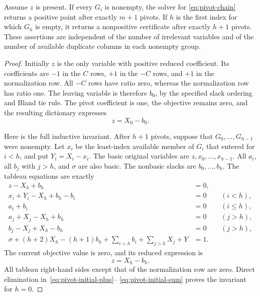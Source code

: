 \begin{lemma}\label{lem:pivot-chain}
Assume $z$ is present. If every $G_i$ is nonempty, the solver for
\eqref{eq:pivot-chain} returns a positive point after exactly $m+1$ pivots.
If $h$ is the first index for which $G_h$ is empty, it returns a nonpositive
certificate after exactly $h+1$ pivots. These assertions are independent
of the number of irrelevant variables and of the number of available
duplicate columns in each nonempty group.
\end{lemma}
\begin{proof}
Initially $z$ is the only variable with positive reduced coefficient.
Its coefficients are $-1$ in the $C$ rows, $+1$ in the $-C$ rows, and
$+1$ in the normalization row. All $-C$ rows have ratio zero, whereas
the normalization row has ratio one. The leaving variable is therefore
$b_0$, by the specified slack ordering and Bland tie rule. The pivot
coefficient is one, the objective remains zero, and the resulting
dictionary expresses
\[
 z=X_0-b_0.
\]

Here is the full inductive invariant. After $h+1$ pivots, suppose that
$G_0,\ldots,G_{h-1}$ were nonempty. Let $x_i$ be the least-index available
member of $G_i$ that entered for $i<h$, and put $Y_i=X_i-x_i$.
The basic original variables are $z,x_0,\ldots,x_{h-1}$. All $a_i$, all
$b_j$ with $j>h$, and $\sigma$ are also basic. The nonbasic slacks are
$b_0,\ldots,b_h$. The tableau equations are exactly
\begin{align}
 z-X_h+b_h&=0,\label{eq:pivot-invariant-z}\\
 x_i+Y_i-X_h+b_h-b_i&=0 &&(i<h),\label{eq:pivot-invariant-old}\\
 a_i+b_i&=0 &&(i\le h),\label{eq:pivot-invariant-completed}\\
 a_j+X_j-X_h+b_h&=0 &&(j>h),\label{eq:pivot-invariant-plus}\\
 b_j-X_j+X_h-b_h&=0 &&(j>h),\label{eq:pivot-invariant-minus}\\
 \sigma+(h+2)X_h-(h+1)b_h
       +\sum_{i<h}b_i+\sum_{j>h}X_j+Y&=1.
       \label{eq:pivot-invariant-normalization}
\end{align}
The current objective value is zero, and its reduced expression is
\begin{equation}\label{eq:pivot-reduced}
 z=X_h-b_h.
\end{equation}
All tableau right-hand sides except that of the normalization row are
zero. Direct elimination in~\eqref{eq:pivot-initial-plus}--
\eqref{eq:pivot-initial-sum} proves the invariant for $h=0$.


\end{proof}
